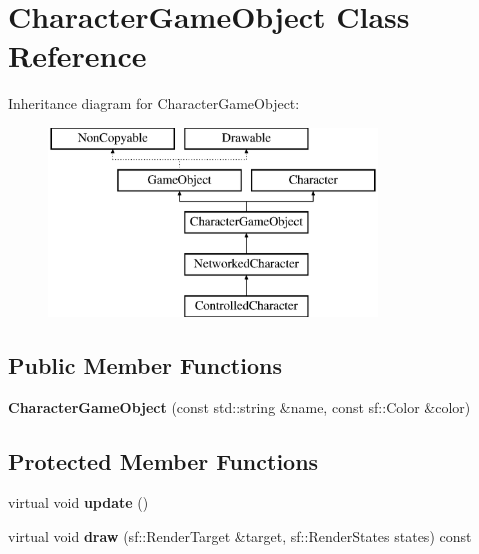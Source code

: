 \hypertarget{class_character_game_object}{\section{Character\-Game\-Object Class Reference}
\label{class_character_game_object}
}
Inheritance diagram for Character\-Game\-Object\-:\begin{figure}[H]
\begin{center}
\leavevmode
\includegraphics[height=5.000000cm]{class_character_game_object}
\end{center}
\end{figure}
\subsection*{Public Member Functions}
\begin{DoxyCompactItemize}
\item 
\hypertarget{class_character_game_object_a50d956248342bf1296fd16ba786ff0b4}{{\bfseries Character\-Game\-Object} (const std\-::string \&name, const sf\-::\-Color \&color)}\label{class_character_game_object_a50d956248342bf1296fd16ba786ff0b4}

\end{DoxyCompactItemize}
\subsection*{Protected Member Functions}
\begin{DoxyCompactItemize}
\item 
\hypertarget{class_character_game_object_a1de579718d33908a7a93a694c5b8b742}{virtual void {\bfseries update} ()}\label{class_character_game_object_a1de579718d33908a7a93a694c5b8b742}

\item 
\hypertarget{class_character_game_object_ad09908d797d148778c390a117da99be6}{virtual void {\bfseries draw} (sf\-::\-Render\-Target \&target, sf\-::\-Render\-States states) const }\label{class_character_game_object_ad09908d797d148778c390a117da99be6}

\end{DoxyCompactItemize}

